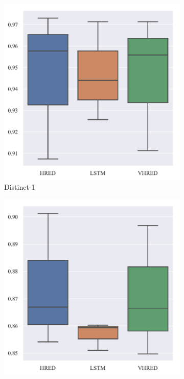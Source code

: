 \begin{figure}[H]
    \begin{subfigure}{0.25\linewidth}
        \centering
        \includegraphics[width=\linewidth]{figure/boxplot/model/distinct_1/plot.pdf}
        \caption{Distinct-1}
    \end{subfigure}%
    \begin{subfigure}{0.25\linewidth}
        \centering
        \includegraphics[width=\linewidth]{figure/boxplot/model/distinct_2/plot.pdf}

\end{subfigure}
\end{figure}
